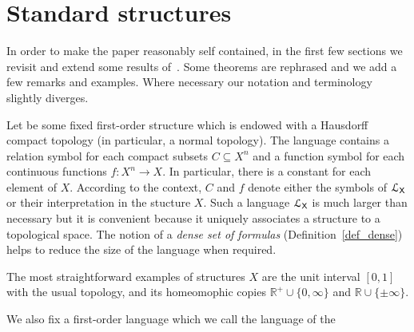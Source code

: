 \documentclass{amsproc}
\renewcommand*{\emph}[1]{%
   \smash{\tikz[baseline]\node[rectangle, fill=teal!25, rounded corners, inner xsep=0.5ex, inner ysep=0.2ex, anchor=base, minimum height = 2.7ex]{\strut #1};}}
\begin{document}
\section{Standard structures}\label{uno}

\def\ceq#1#2#3{\parbox[t]{23ex}{$\displaystyle #1$}\parbox{6ex}{\hfil $#2$}{$\displaystyle #3$}}

In order to make the paper reasonably self contained, in the first few sections we revisit and extend some results of~\cite{clcl}.
Some theorems are rephrased and we add a few remarks and examples.
Where necessary our notation and terminology slightly diverges.

Let \emph{$X$\/} be some fixed first-order structure which is endowed with a Hausdorff compact topology (in particular, a normal topology).
The language \emph{${\EuScript L}_{\sf X}$\/} contains a relation symbol for each compact subsets $C\subseteq X^n$ and a function symbol for each continuous functions $f:X^n\to X$.
In particular, there is a constant for each element of $X$.
According to the context, $C$ and $f$ denote either the symbols of ${\EuScript L}_{\sf X}$ or their interpretation in the stucture $X$.
Such a language ${\EuScript L}_{\sf X}$ is much larger than necessary but it is convenient because it uniquely associates a structure to a topological space.
The notion of a \textit{dense set of formulas\/} (Definition~\ref{def_dense}) helps to reduce the size of the language when required.

The most straightforward examples of structures $X$ are the unit interval $[0,1]$ with the usual topology, and its homeomophic copies $\mathds{R}^+\cup\{0,\infty\}$ and $\mathds{R}\cup\{\pm\infty\}$.

We also fix a first-order language \emph{${\EuScript L}_{\sf H}$\/} which we call the language of the \emph{home sort.}
\end{document}
